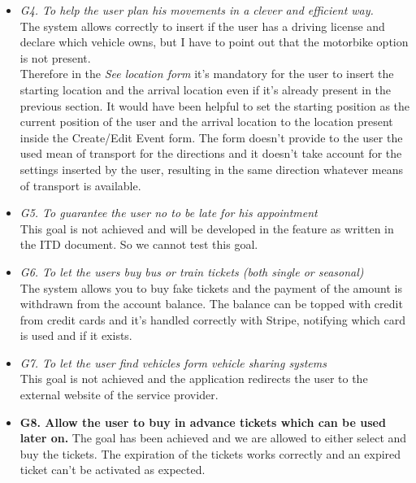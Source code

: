 \begin{itemize}
\item \textit{G4. To help the user plan his movements in a clever and efficient way.}\\
The system allows correctly to insert if the user has a driving license and declare which vehicle owns, but I have to point out that the motorbike option is not present. \\
Therefore in the \textit{See location form} it's mandatory for the user to insert the starting location and the arrival location even if it's already present in the previous section. It would have been helpful to set the starting position as the current position of the user and the arrival location to the location present inside the Create/Edit Event form. The form doesn't provide to the user the used mean of transport for the directions and it doesn't take account for the settings inserted by the user, resulting in the same direction whatever means of transport is available.

\item \textit{G5. To guarantee the user no to be late for his appointment}\\
This goal is not achieved and will be developed in the feature as written in the ITD document. So we cannot test this goal.

\item \textit{G6. To let the users buy bus or train tickets (both single or seasonal) }\\
The system allows you to buy fake tickets and the payment of the amount is withdrawn from the account balance.
The balance can be topped with credit from credit cards and it's handled correctly with Stripe, notifying which card is used and if it exists.

\item \textit{G7. To let the user find vehicles form vehicle sharing systems}\\
This goal is not achieved and the application redirects the user to the external website of the service provider.

\item \textbf{G8. Allow the user to buy in advance tickets which can be used later on.}
The goal has been achieved and we are allowed to either select and buy the tickets. The expiration of the tickets works correctly and an expired ticket can't be activated as expected.


\end{itemize}